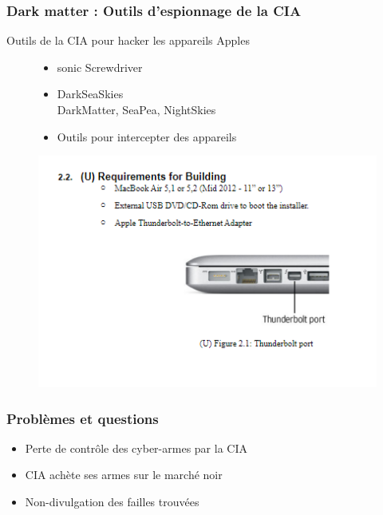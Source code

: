 \documentclass{beamer}
\begin{document}
		\begin{frame}
			\frametitle{Dark matter : Outils d'espionnage de la CIA}
			Outils de la CIA pour hacker les appareils Apples
			\begin{figure}
				\begin{minipage}[c]{.54\linewidth}
					\begin{itemize}
					\item[\textbullet] sonic Screwdriver
						\item[\textbullet] DarkSeaSkies \\
						DarkMatter, SeaPea, NightSkies
						\item[\textbullet] Outils pour intercepter des appareils 
					\end{itemize}
				\end{minipage}
				\begin{minipage}[c]{.45\linewidth}
				\includegraphics[scale=0.5]{MAC.png}
				\end{minipage}
			\end{figure}	
		\end{frame}
		
		\begin{frame}
			\frametitle{Problèmes et questions}
			\begin{itemize}
				\item[\textbullet] Perte de contrôle des cyber-armes par la CIA
				\item[\textbullet] CIA achète ses armes sur le marché noir
				\item[\textbullet] Non-divulgation des failles trouvées
				
			\end{itemize}
		\end{frame}
		
	
\end{document}
